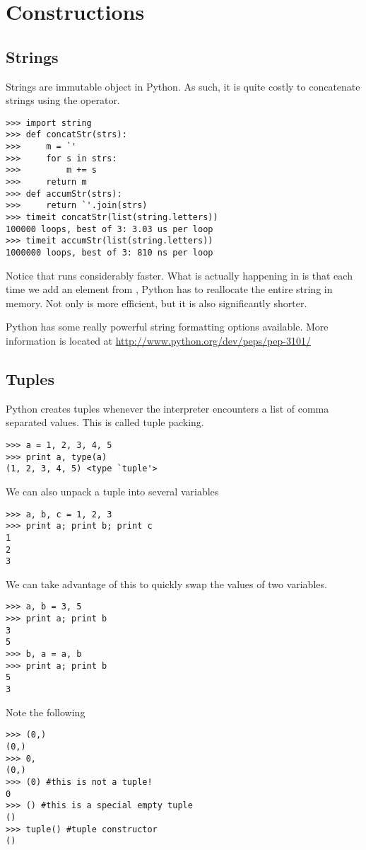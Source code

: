 \section*{Constructions}

\subsection*{Strings}
Strings are immutable object in Python.  As such, it is quite costly to concatenate strings using the \li{+} operator.
\begin{lstlisting}
>>> import string
>>> def concatStr(strs):
>>>     m = `'
>>>     for s in strs:
>>>         m += s
>>>     return m
>>> def accumStr(strs):
>>>     return `'.join(strs)
>>> timeit concatStr(list(string.letters))
100000 loops, best of 3: 3.03 us per loop
>>> timeit accumStr(list(string.letters))
1000000 loops, best of 3: 810 ns per loop
\end{lstlisting}
Notice that  runs considerably faster.  What is actually happening in  is that each time we add an element from , Python has to reallocate the entire string in memory.  Not only is  more efficient, but it is also significantly shorter.

Python has some really powerful string formatting options available.  More information is located at \url{http://www.python.org/dev/peps/pep-3101/}

\subsection*{Tuples}
Python creates tuples whenever the interpreter encounters a list of comma separated values.  This is called tuple packing.
\begin{lstlisting}
>>> a = 1, 2, 3, 4, 5
>>> print a, type(a)
(1, 2, 3, 4, 5) <type `tuple'>
\end{lstlisting}
We can also unpack a tuple into several variables
\begin{lstlisting}
>>> a, b, c = 1, 2, 3
>>> print a; print b; print c
1
2
3
\end{lstlisting}
We can take advantage of this to quickly swap the values of two variables.
\begin{lstlisting}
>>> a, b = 3, 5
>>> print a; print b
3
5
>>> b, a = a, b
>>> print a; print b
5
3
\end{lstlisting}
Note the following
\begin{lstlisting}
>>> (0,)
(0,)
>>> 0,
(0,)
>>> (0) #this is not a tuple!
0
>>> () #this is a special empty tuple
()
>>> tuple() #tuple constructor
()
\end{lstlisting}

